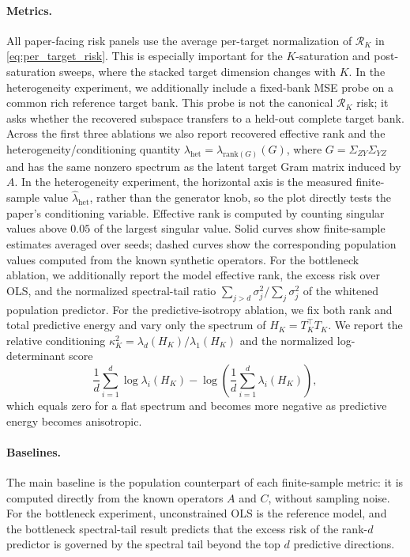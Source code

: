 \paragraph{Metrics.}
All paper-facing risk panels use the average per-target normalization of
$\mathcal R_K$ in \eqref{eq:per_target_risk}. This is especially important for
the $K$-saturation and post-saturation sweeps, where the stacked target
dimension changes with $K$. In the heterogeneity experiment, we additionally
include a fixed-bank MSE probe on a common rich reference target bank. This
probe is not the canonical $\mathcal R_K$ risk; it asks whether the recovered
subspace transfers to a held-out complete target bank. Across the first three
ablations we also report recovered effective rank and the
heterogeneity/conditioning quantity
$\lambda_{\mathrm{het}}=\lambda_{\mathrm{rank}(G)}(G)$, where
$G=\Sigma_{ZY}\Sigma_{YZ}$ and has the same nonzero spectrum as the latent
target Gram matrix induced by $A$. In the heterogeneity experiment, the
horizontal axis is the measured finite-sample value
$\widehat{\lambda}_{\mathrm{het}}$, rather than the generator knob, so the plot
directly tests the paper's conditioning variable. Effective rank is computed by
counting singular values above $0.05$ of the largest singular value. Solid
curves show finite-sample estimates averaged over seeds; dashed curves show the
corresponding population values computed from the known synthetic operators.
For the bottleneck ablation, we additionally report the model effective rank,
the excess risk over OLS, and the normalized spectral-tail ratio
$\sum_{j>d}\sigma_j^2/\sum_j\sigma_j^2$ of the whitened population predictor.
For the predictive-isotropy ablation, we fix both rank and total predictive
energy and vary only the spectrum of
$H_K=T_K^\top T_K$. We report the relative conditioning
$\kappa_K^2=\lambda_d(H_K)/\lambda_1(H_K)$ and the normalized log-determinant
score
\[
    \frac{1}{d}\sum_{i=1}^d \log \lambda_i(H_K)
    -
    \log\left(\frac{1}{d}\sum_{i=1}^d \lambda_i(H_K)\right),
\]
which equals zero for a flat spectrum and becomes more negative as predictive
energy becomes anisotropic.

\paragraph{Baselines.}
The main baseline is the population counterpart of each finite-sample metric:
it is computed directly from the known operators $A$ and $C$, without sampling
noise. For the bottleneck experiment, unconstrained OLS is the reference model,
and the bottleneck spectral-tail result predicts that the excess risk of the rank-$d$ predictor is
governed by the spectral tail beyond the top $d$ predictive directions.

